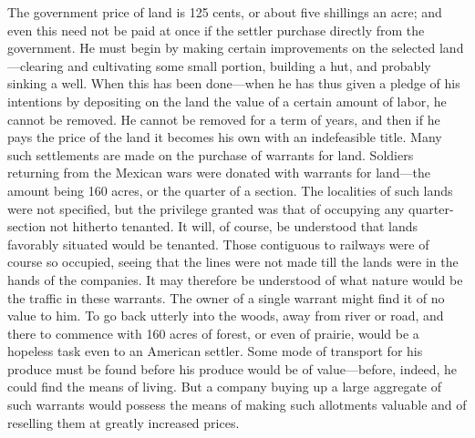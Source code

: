 The government price of land is 125 cents, or about five shillings
an acre; and even this need not be paid at once if the settler
purchase directly from the government.  He must begin by making
certain improvements on the selected land---clearing and cultivating
some small portion, building a hut, and probably sinking a well.
When this has been done---when he has thus given a pledge of his
intentions by depositing on the land the value of a certain amount
of labor, he cannot be removed.  He cannot be removed for a term of
years, and then if he pays the price of the land it becomes his own
with an indefeasible title.  Many such settlements are made on the
purchase of warrants for land.  Soldiers returning from the Mexican
wars were donated with warrants for land---the amount being 160
acres, or the quarter of a section.  The localities of such lands
were not specified, but the privilege granted was that of occupying
any quarter-section not hitherto tenanted.  It will, of course, be
understood that lands favorably situated would be tenanted.  Those
contiguous to railways were of course so occupied, seeing that the
lines were not made till the lands were in the hands of the
companies.  It may therefore be understood of what nature would be
the traffic in these warrants.  The owner of a single warrant might
find it of no value to him.  To go back utterly into the woods,
away from river or road, and there to commence with 160 acres of
forest, or even of prairie, would be a hopeless task even to an
American settler.  Some mode of transport for his produce must be
found before his produce would be of value---before, indeed, he
could find the means of living.  But a company buying up a large
aggregate of such warrants would possess the means of making such
allotments valuable and of reselling them at greatly increased
prices.

